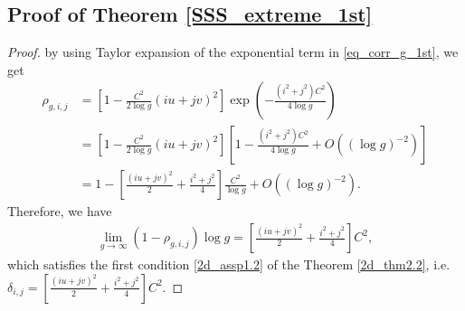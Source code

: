 \documentclass{article}
\begin{document}
\begin{appendices}
	\subsection{Proof of Theorem \ref{SSS_extreme_1st}}
	\label{proof_1st_thm}
	\begin{proof}
		by using Taylor expansion of the exponential term in \eqref{eq_corr_g_1st}, we get
		\begin{equation*}
			\label{eq_rho_taylor_1st}
			\begin{aligned}
				\rho_{g,i,j}&= [1-\frac{C^2}{2\log g}(iu+jv)^2]\exp(-\frac{(i^2+j^2)C^2}{4\log g})\\&=[1-\frac{C^2}{2\log g}(iu+jv)^2][1-\frac{(i^2+j^2)C^2}{4\log g}+O((\log g)^{-2})]\\
				&=1-[\frac{(iu+jv)^2}{2}+\frac{i^2+j^2}{4}]\frac{C^2}{\log g}+O((\log g)^{-2}).
			\end{aligned}
		\end{equation*}
		Therefore, we have
		\begin{equation*}
			\begin{aligned}
				\lim_{g\rightarrow\infty}(1-\rho_{g,i,j})\log g=[\frac{(iu+jv)^2}{2}+\frac{i^2+j^2}{4}]C^2,
			\end{aligned}
		\end{equation*}
		which satisfies the first condition \eqref{2d_assp1.2} of the Theorem \ref{2d_thm2.2}, i.e. $\delta_{i,j}=[\frac{(iu+jv)^2}{2}+\frac{i^2+j^2}{4}]C^2$.
		

\end{proof}
\end{appendices}
\end{document}
